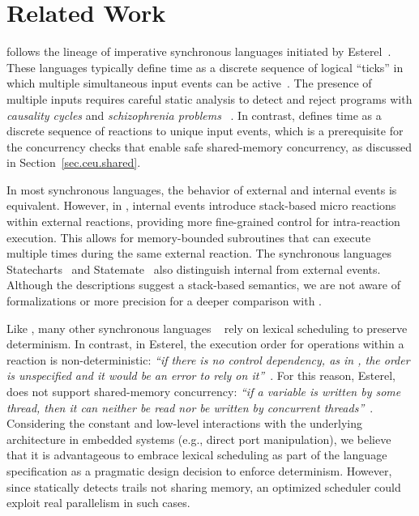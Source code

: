 \section{Related Work}

\CEU follows the lineage of imperative synchronous languages initiated by
Esterel~\cite{esterel.ieee91}.
These languages typically define time as a discrete sequence of logical
``ticks'' in which multiple simultaneous input events can be
active~\cite{ceu.tecs17}.
%
The presence of multiple inputs requires careful static analysis to detect and
reject programs with \emph{causality cycles} and \emph{schizophrenia problems}%
~\cite{esterel.constructive}.
%
In contrast, \CEU defines time as a discrete sequence of reactions to
unique input events, which is a prerequisite for the concurrency checks that
enable safe shared-memory concurrency, as discussed in
Section~\ref{sec.ceu.shared}.

In most synchronous languages, the behavior of external and internal events is
equivalent.
However, in \CEU, internal events introduce stack-based micro reactions within
external reactions, providing more fine-grained control for intra-reaction
execution.
%
This allows for memory-bounded subroutines that can execute multiple times
during the same external reaction.
%
The synchronous languages Statecharts~\cite{statecharts.variants} and
Statemate~\cite{statecharts.statemate} also distinguish internal from external
events.
Although the descriptions suggest a stack-based semantics, we are not aware of
formalizations or more precision for a deeper comparison with \CEU.

Like \CEU, many other synchronous languages%
~\cite{rp.rc,wsn.protothreads,wsn.sol,rp.synchc,rp.pretc}
rely on lexical scheduling to preserve determinism.
%
In contrast, in Esterel, the execution order for operations within a reaction
is non-deterministic: \emph{``if there is no control dependency, as in
{\scriptsize{}},
the order is unspecified and it would be an error to rely on
it''}~\cite{esterel.primer}.
%
For this reason, Esterel, does not support shared-memory concurrency:
\emph{``if a variable is written by some thread, then it can neither be read
nor be written by concurrent threads''}~\cite{esterel.primer}.
%
Considering the constant and low-level interactions with the underlying
architecture in embedded systems (e.g., direct port manipulation), we believe
that it is advantageous to embrace lexical scheduling as part of the language
specification as a pragmatic design decision to enforce determinism.
%
However, since \CEU statically detects trails not sharing memory, an optimized
scheduler could exploit real parallelism in such cases.

